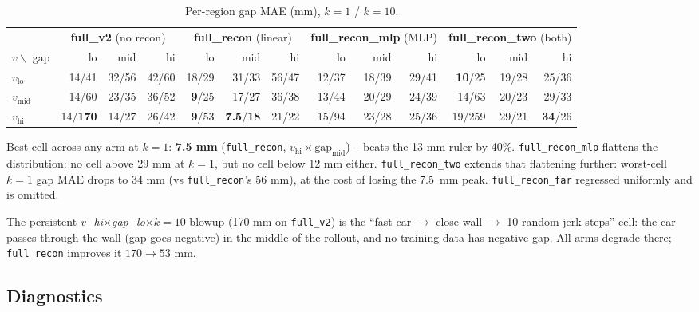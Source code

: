 \documentclass[11pt,a4paper]{article}
\begin{document}
\begin{table}[h]
\centering
\footnotesize
\caption{Per-region gap MAE (mm), $k{=}1$ / $k{=}10$.}
\label{tab:regions}
\setlength{\tabcolsep}{4pt}
\begin{tabular}{l|rrr|rrr|rrr|rrr}
\toprule
& \multicolumn{3}{c|}{\textbf{full\_v2} (no recon)}
& \multicolumn{3}{c|}{\textbf{full\_recon} (linear)}
& \multicolumn{3}{c|}{\textbf{full\_recon\_mlp} (MLP)}
& \multicolumn{3}{c}{\textbf{full\_recon\_two} (both)} \\
$v \backslash$ gap & lo & mid & hi & lo & mid & hi & lo & mid & hi & lo & mid & hi \\
\midrule
$v_{\text{lo}}$  & 14/41  & 32/56 & 42/60
                 & 18/29 & 31/33 & 56/47
                 & 12/37 & 18/39 & 29/41
                 & \textbf{10}/25 & 19/28 & 25/36 \\
$v_{\text{mid}}$ & 14/60  & 23/35 & 36/52
                 & \textbf{9}/25 & 17/27 & 36/38
                 & 13/44 & 20/29 & 24/39
                 & 14/63 & 20/23 & 29/33 \\
$v_{\text{hi}}$  & 14/\textbf{170} & 14/27 & 26/42
                 & \textbf{9}/53 & \textbf{7.5}/\textbf{18} & 21/22
                 & 15/94 & 23/28 & 25/36
                 & 19/259 & 29/21 & \textbf{34}/26 \\
\bottomrule
\end{tabular}
\end{table}

Best cell across any arm at $k{=}1$: \textbf{7.5 mm} (\texttt{full\_recon},
$v_\text{hi} \times \text{gap}_\text{mid}$) -- beats the 13 mm ruler by 40\%.
\texttt{full\_recon\_mlp} flattens the distribution: no cell above 29 mm at
$k{=}1$, but no cell below 12 mm either. \texttt{full\_recon\_two} extends
that flattening further: worst-cell $k{=}1$ gap MAE drops to 34 mm (vs
\texttt{full\_recon}'s 56 mm), at the cost of losing the \SI{7.5}{\mm}
peak. \texttt{full\_recon\_far} regressed uniformly and is omitted.

The persistent \emph{v\_hi}$\times$\emph{gap\_lo}$\times k{=}10$ blowup
(170 mm on \texttt{full\_v2}) is the ``fast car $\to$ close wall $\to$ 10
random-jerk steps'' cell: the car passes through the wall (gap goes negative)
in the middle of the rollout, and no training data has negative gap. All arms
degrade there; \texttt{full\_recon} improves it $170 \to 53$ mm.

\subsection{Diagnostics}
\end{document}
